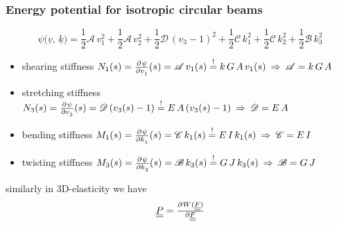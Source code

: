 \begin{frame}
  \frametitle{Energy potential for isotropic circular beams}

  \begin{displaymath}
    \psi \bigl( \underline{v}, \, \underline{k} \bigr) =
    \frac{1}{2} \mathscr{A} \, v_1^2 +
    \frac{1}{2} \mathscr{A} \, v_2^2 +
    \frac{1}{2} \mathscr{D} \, (v_3-1)^2 +
    \frac{1}{2} \mathscr{C} \, k_1^2 +
    \frac{1}{2} \mathscr{C} \, k_2^2 +
    \frac{1}{2} \mathscr{B} \, k_3^2
  \end{displaymath}
  
  \vspace{0.5em}
  \begin{itemize}
    \item shearing stiffness \newline
      $N_1(s) = \pd{\psi}{v_1}(s) = \mathscr{A} \, v_1(s) \overset{!}{=} k \, G \, A \, v_1(s)
      \: \Rightarrow \:
      \mathscr{A} = k \, G \, A$
      
    \item stretching stiffness \newline
      $N_3(s) = \pd{\psi}{v_3}(s) = \mathscr{D} \, (v_3(s) -1) \overset{!}{=} E \, A \, ( v_3(s) -1)
      \: \Rightarrow \:
      \mathscr{D} = E \, A$
      
    \item bending stiffness \newline
      $M_1(s) = \pd{\psi}{k_1}(s) = \mathscr{C} \, k_1(s) \overset{!}{=} E \, I \, k_1(s)
      \: \Rightarrow \:
      \mathscr{C} = E \, I$
      
    \item twisting stiffness \newline
      $M_3(s) = \pd{\psi}{k_3}(s) = \mathscr{B} \, k_3(s) \overset{!}{=} G \, J \, k_3(s)
      \: \Rightarrow \:
      \mathscr{B} = G \, J$
  \end{itemize}
  
  \vspace{1em}
  similarly in 3D-elasticity we have
  \begin{displaymath}
    \doubleunderline{P} = \pd{W(\doubleunderline{F})}{\doubleunderline{F}}
  \end{displaymath}
\end{frame}


